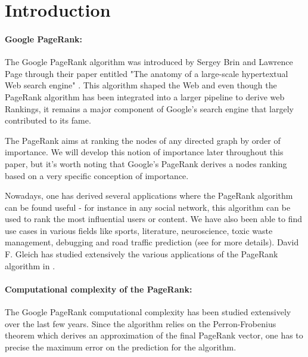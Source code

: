 \documentclass[sn-mathphys]{sn-jnl}%
\theoremstyle{thmstyleone}%
\theoremstyle{thmstyletwo}%
\theoremstyle{thmstylethree}%
\begin{document}

\maketitle

\section{Introduction}

\paragraph{Google PageRank:}
The Google PageRank algorithm was introduced by Sergey Brin and
Lawrence Page through their paper entitled "The anatomy of a
large-scale hypertextual Web search engine"
\cite{brin_page_1998}. This algorithm shaped the Web and even though
the PageRank algorithm has been integrated into a larger pipeline to
derive web Rankings, it remains a major component of Google's search
engine that largely contributed to its fame.

The PageRank aims at ranking the nodes of any directed graph by order
of importance. We will develop this notion of importance later
throughout this paper, but it's worth noting that Google's PageRank
derives a nodes ranking based on a very specific conception of
importance.

Nowadays, one has derived several applications where the PageRank
algorithm can be found useful - for instance in any social network,
this algorithm can be used to rank the most influential users or
content. We have also been able to find use cases in various fields
like sports, literature, neuroscience, toxic waste management,
debugging and road traffic prediction (see \cite{cornell_pagerank} for
more details). David F. Gleich has studied extensively the various
applications of the PageRank algorithm in \cite{gleich_2015}.

\paragraph{Computational complexity of the PageRank:} The Google
PageRank computational complexity has been studied extensively over
the last few years. Since the algorithm relies on the Perron-Frobenius
theorem which derives an approximation of the final PageRank vector,
one has to precise the maximum error on the prediction for the
algorithm.
\end{document}
